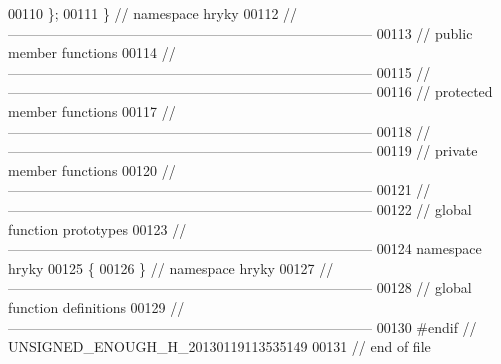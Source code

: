 \begin{DoxyCode}
00110 \};
00111 \} \textcolor{comment}{// namespace hryky}
00112 \textcolor{comment}{//
      ------------------------------------------------------------------------------}
00113 \textcolor{comment}{// public member functions}
00114 \textcolor{comment}{//
      ------------------------------------------------------------------------------}
00115 \textcolor{comment}{//
      ------------------------------------------------------------------------------}
00116 \textcolor{comment}{// protected member functions}
00117 \textcolor{comment}{//
      ------------------------------------------------------------------------------}
00118 \textcolor{comment}{//
      ------------------------------------------------------------------------------}
00119 \textcolor{comment}{// private member functions}
00120 \textcolor{comment}{//
      ------------------------------------------------------------------------------}
00121 \textcolor{comment}{//
      ------------------------------------------------------------------------------}
00122 \textcolor{comment}{// global function prototypes}
00123 \textcolor{comment}{//
      ------------------------------------------------------------------------------}
00124 \textcolor{keyword}{namespace }hryky
00125 \{
00126 \} \textcolor{comment}{// namespace hryky}
00127 \textcolor{comment}{//
      ------------------------------------------------------------------------------}
00128 \textcolor{comment}{// global function definitions}
00129 \textcolor{comment}{//
      ------------------------------------------------------------------------------}
00130 \textcolor{preprocessor}{#endif // UNSIGNED\_ENOUGH\_H\_20130119113535149}
00131 \textcolor{preprocessor}{}\textcolor{comment}{// end of file}
\end{DoxyCode}
